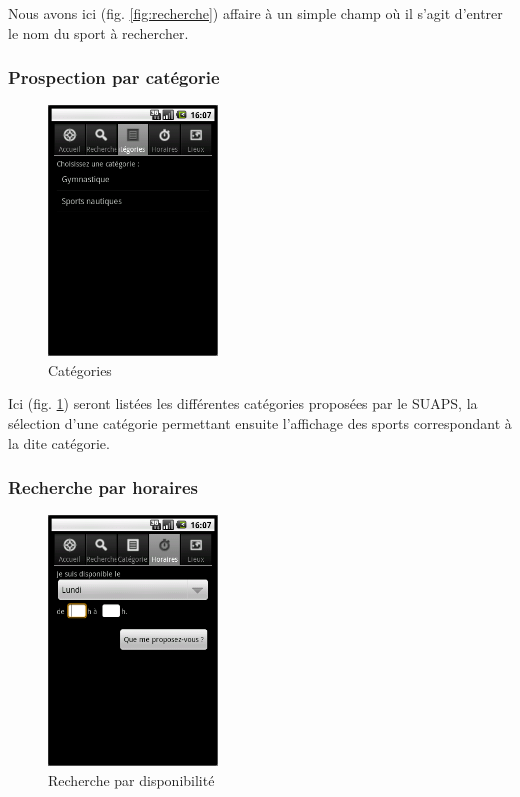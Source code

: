 \documentclass[french, titlepage, 11pt, a4paper]{article}
\begin{document}
		Nous avons ici (fig. \ref{fig:recherche}) affaire à un simple champ où il
		s'agit d'entrer le nom du sport à rechercher.

		\subsubsection{Prospection par catégorie}

		\begin{figure}[htb]
			\centering
			\includegraphics[width=0.4\textwidth]{categories.png}
			\caption{Catégories}
			\label{fig:categories}
		\end{figure}

		Ici (fig. \ref{fig:categories}) seront listées les différentes catégories
		proposées par le SUAPS, la sélection d'une catégorie permettant ensuite
		l'affichage des sports correspondant à la dite catégorie.

		\subsubsection{Recherche par horaires}

		\begin{figure}[htb]
			\centering
			\includegraphics[width=0.4\textwidth]{horaires.png}
			\caption{Recherche par disponibilité}
			\label{fig:horaires}
		\end{figure}
\end{document}
